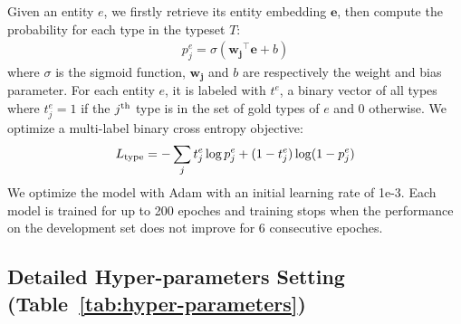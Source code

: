 \documentclass[letterpaper]{article} \usepackage{aaai20}  \usepackage{times}  \usepackage{helvet} \usepackage{courier}  \usepackage[hyphens]{url}  \usepackage{graphicx} \urlstyle{rm} \def\UrlFont{\rm}  \usepackage{graphicx}  \frenchspacing  \setlength{\pdfpagewidth}{8.5in}  \setlength{\pdfpageheight}{11in}  \usepackage{multirow}
\begin{document}
Given an entity $e$, we firstly retrieve its entity embedding $\mathbf{e}$, then compute the probability for each type in the typeset $T$: 
\begin{align}
    p_j^e = \sigma(\mathbf{w_j}^\top \mathbf{e} + b)
\end{align}
where $\sigma$ is the sigmoid function, $\mathbf{w_j}$ and $b$ are respectively the weight and bias parameter. For each entity $e$, it is labeled with $t^e$, a binary vector of all types where $t_j^e=1$ if the $j^{\rm th}$ type is in the set of gold types of $e$ and 0 otherwise. We optimize a multi-label binary cross entropy objective:
\begin{align}
    L_{\rm type}= -\sum_j t_j^e \log p_j^e + (1-t_j^e)\log(1-p_j^e)
\end{align}
We optimize the model with Adam with an initial learning rate of 1e-3. Each model is trained for up to 200 epoches and training stops when the performance on the development set does not improve for 6 consecutive epoches. 

\subsection{Detailed Hyper-parameters Setting (Table~\ref{tab:hyper-parameters})}
\label{app:hp}

    \begin{table}[!ht]
        \small
        \centering
        \caption{Values of hyper-parameters.}
        \label{tab:hyper-parameters}
    \end{table}



\end{document}
